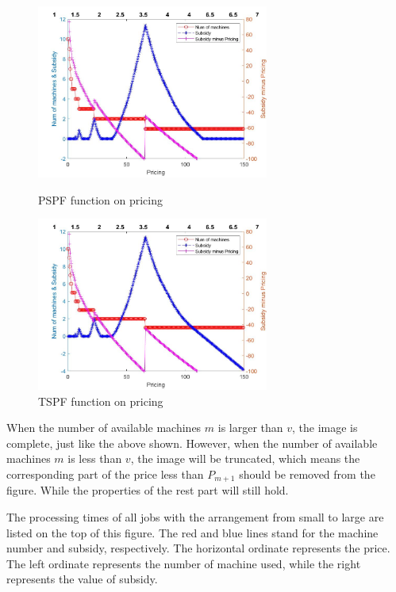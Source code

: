 \begin{figure}
\begin{minipage}[t]{0.5\linewidth}
\centering
\includegraphics[width=3in]{Figures/Image1}
\caption{PSPF function on pricing}
\label{fig-PSPF}
\end{minipage}%
\begin{minipage}[t]{0.5\linewidth}
\centering
\includegraphics[width=3in]{Figures/Image2}
\caption{TSPF function on pricing}
\label{fig-TSPF}
\end{minipage}
\end{figure}


\begin{remark}
  When the number of available machines $m$ is larger than $v$, the image is complete, just like the above shown. However, when the number of available machines $m$ is less than $v$, the image will be truncated, which means the corresponding part of the price less than $P_{m+1}$ should be removed from the figure. While the properties of the rest part will still hold.
\end{remark}

The processing times of all jobs with the arrangement from small to large are listed on the top of this figure.
The red and blue lines stand for the machine number and subsidy, respectively.
The horizontal ordinate represents the price.
The left ordinate represents the number of machine used, while the right represents the value of subsidy.

